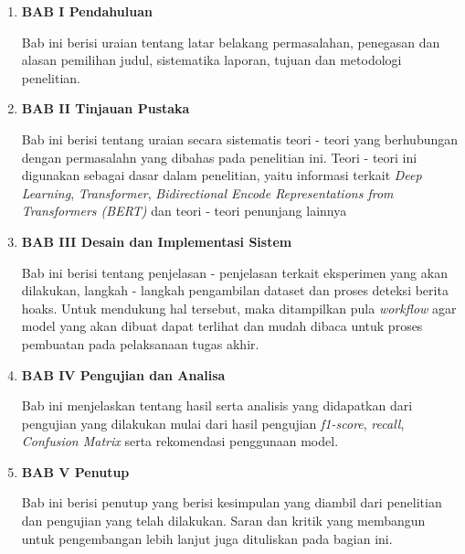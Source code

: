 \begin{enumerate}[topsep=0em]

      \item \textbf{BAB I Pendahuluan}

            Bab ini berisi uraian tentang latar belakang permasalahan, penegasan dan alasan pemilihan judul, sistematika laporan, tujuan dan metodologi penelitian.

      \item \textbf{BAB II Tinjauan Pustaka}

            Bab ini berisi tentang uraian secara sistematis teori - teori yang berhubungan dengan permasalahn yang dibahas pada penelitian ini. Teori - teori ini digunakan sebagai dasar dalam penelitian, yaitu informasi terkait \textit{Deep Learning}, \textit{Transformer}, \textit{Bidirectional Encode Representations from Transformers (BERT)} dan teori - teori penunjang lainnya

      \item \textbf{BAB III Desain dan Implementasi Sistem}

            Bab ini berisi tentang penjelasan - penjelasan terkait eksperimen yang akan dilakukan, langkah - langkah pengambilan dataset dan proses deteksi berita hoaks. Untuk mendukung hal tersebut, maka ditampilkan pula \textit{workflow} agar model yang akan dibuat dapat terlihat dan mudah dibaca untuk proses pembuatan pada pelaksanaan tugas akhir.

      \item \textbf{BAB IV Pengujian dan Analisa}

            Bab ini menjelaskan tentang hasil serta analisis yang didapatkan dari pengujian yang dilakukan mulai dari hasil pengujian \textit{f1-score}, \textit{recall}, \textit{Confusion Matrix} serta rekomendasi penggunaan model.

      \item \textbf{BAB V Penutup}

            Bab ini berisi penutup yang berisi kesimpulan yang diambil dari penelitian dan pengujian yang telah dilakukan. Saran dan kritik yang membangun untuk pengembangan lebih lanjut juga dituliskan pada bagian ini.

\end{enumerate}
